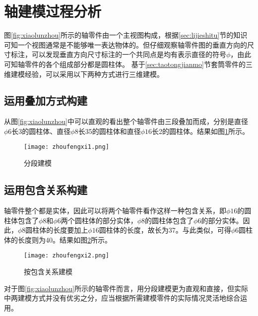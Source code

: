 \section{轴建模过程分析}\label{sec:zhoufengxi}
图\ref{fig:xiaolunzhou}所示的轴零件由一个主视图构成，根据\ref{sec:lijieshitu}节的知识可知一个视图通常是不能够唯一表达物体的。但仔细观察轴零件图的垂直方向的尺寸标注，可以发现垂直方向尺寸标注的一个共同点是均有表示直径的符号$\phi$，由此可知轴零件的各个组成部分都是圆柱体。 基于\ref{sec:taotongjianmo}节套筒零件的三维建模经验，可以采用以下两种方式进行三维建模。

\subsection{运用叠加方式构建}
从图\ref{fig:xiaolunzhou}中可以直观的看出整个轴零件由三段叠加而成，分别是直径$\phi 6$长3的圆柱体、直径$\phi 8$长35的圆柱体和直径$\phi 16$长2的圆柱体。结果如图\ref{fig:zhoufengxi1}所示。
\begin{figure}[htbp]
\centering
\texttt{[image: zhoufengxi1.png]}
\caption{分段建模}\label{fig:zhoufengxi1}
\end{figure}
\subsection{运用包含关系构建}
轴零件整个都是实体，因此可以将两个轴零件看作这样一种包含关系，即$\phi 16$的圆柱体包含了$\phi 8$和$\phi 6$两个圆柱体的部分实体，$\phi 8$的圆柱体包含了$\phi 6$的部分实体。因此，$\phi 8$圆柱体的长度要加上$\phi 16$圆柱体的长度，故长为37。与此类似，可得$\phi 6$圆柱体的长度则为40。结果如图\ref{fig:zhoufengxi2}所示。
\begin{figure}[htbp]
\centering
\texttt{[image: zhoufengxi2.png]}
\caption{按包含关系建模}\label{fig:zhoufengxi2}
\end{figure}

对于图\ref{fig:xiaolunzhou}所示的轴零件而言，用分段建模更为直观和直接，但实际中两建模方式并没有优劣之分，应当根据所需建模零件的实际情况灵活地综合运用。
\endinput